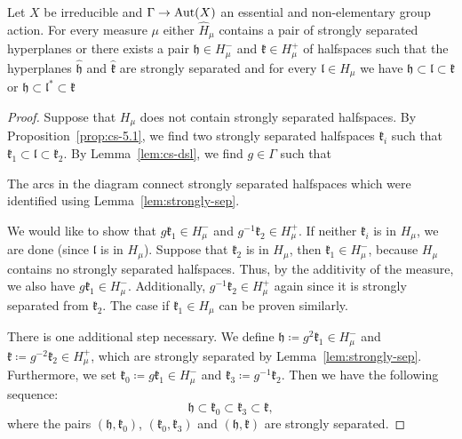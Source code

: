 \begin{lemma}[{\cite[Lemma~4.19]{MR3509968}}]
  \label{lem:4.19}
  Let \(X\) be irreducible and \(\Gamma \to \operatorname{Aut}(X)\) an essential and non-elementary group action. For every measure \(\mu\) either \(\hat H_\mu\) contains a pair of strongly separated hyperplanes or there exists a pair \(\mathfrak{h} \in H_\mu^-\) and \(\mathfrak{k} \in H_\mu^+\) of halfspaces such that the hyperplanes \(\mathfrak{\hat h}\) and \(\mathfrak{\hat k}\) are strongly separated and for every \(\mathfrak{l} \in H_\mu\) we have  \(\mathfrak{h} \subset \mathfrak{l} \subset  \mathfrak{k}\) or \(\mathfrak{h} \subset \mathfrak{l}^\ast \subset \mathfrak{k}\)
\end{lemma}

\begin{proof}
  Suppose that \(H_\mu\) does not contain strongly separated halfspaces. By Proposition\ \ref{prop:cs-5.1}, we find two strongly separated halfspaces \(\mathfrak{k}_i\) such that \(\mathfrak{k}_1 \subset \mathfrak{l} \subset \mathfrak{k}_2\). By Lemma~\ref{lem:cs-dsl}, we find \(g \in \Gamma\) such that
  \begin{center}
    
  \end{center}
  The arcs in the diagram connect strongly separated halfspaces which were identified using Lemma~\ref{lem:strongly-sep}.

  We would like to show that \(g\mathfrak{k}_1 \in H_\mu^-\) and \(g^{-1}\mathfrak{k}_2 \in H_\mu^+\). If neither \(\mathfrak{k}_i\) is in \(H_\mu\), we are done (since \(\mathfrak{l}\) is in \(H_\mu\)). Suppose that \(\mathfrak{k}_2\) is in \(H_\mu\), then \(\mathfrak{k}_1 \in H_\mu^-\), because \(H_\mu\) contains no strongly separated halfspaces. Thus, by the additivity of the measure, we also have \(g\mathfrak{k}_1 \in H_\mu^-\). Additionally, \(g^{-1}\mathfrak{k}_2 \in H_\mu^+\) again since it is strongly separated from \(\mathfrak{k}_2\). The case if \(\mathfrak{k}_1 \in H_\mu\) can be proven similarly.

  There is one additional step necessary. We define \(\mathfrak{h} \coloneqq g^2\mathfrak{k}_1 \in H_\mu^-\) and \(\mathfrak{k} \coloneqq g^{-2}\mathfrak{k}_2 \in H_\mu^+\), which are strongly separated by Lemma~\ref{lem:strongly-sep}. Furthermore, we set \(\mathfrak{k_0} \coloneqq g\mathfrak{k}_1 \in H_\mu^-\) and \(\mathfrak{k}_3 \coloneqq g^{-1}\mathfrak{k}_2\). Then we have the following sequence:
  \[
    \mathfrak{h} \subset \mathfrak{k}_0 \subset \mathfrak{k}_3 \subset \mathfrak{k},
  \]
  where the pairs \((\mathfrak{h}, \mathfrak{k}_0)\), \((\mathfrak{k_0}, \mathfrak{k}_3)\) and \((\mathfrak{h}, \mathfrak{k})\) are strongly separated. 


\end{proof}
